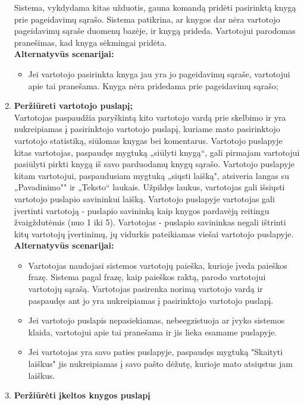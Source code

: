 \documentclass{VUMIFPSkursinis}
\begin{document}
\begin{enumerate}[label=\textbf{U\arabic*.}]
				Sistema, vykdydama kitas užduotis, gauna komandą pridėti pasirinktą knygą prie pageidavimų sąrašo.
				Sistema patikrina, ar knygos dar nėra vartotojo pageidavimų sąraše duomenų bazėje, ir knygą prideda.
				Vartotojui parodomas pranešimas, kad knyga sėkmingai pridėta.\\
				\textbf{Alternatyvūs scenarijai:}
				\begin{itemize}
					\item Jei vartotojo pasirinkta knyga jau yra jo pageidavimų sąraše, vartotojui apie tai pranešama. Knyga nėra pridedama prie pageidavimų sąrašo;
				\end{itemize}
			\item \textbf{Peržiūreti vartotojo puslapį;}\\
				Vartotojas paspaudžia paryškintą kito vartotojo vardą prie skelbimo ir yra nukreipiamas į pasirinktojo vartotojo puslapį, kuriame mato pasirinktojo vartotojo statistiką, siūlomas knygas bei komentarus. 
				Vartotojo puslapyje kitas vartotojas, paspaudęs mygtuką „siūlyti knygą“, gali pirmajam vartotojui pasiūlyti pirkti knygą iš savo parduodamų knygų sąrašo.
				Vartotojo puslapyje kitam vartotojui, paspaudusiam mygtuką „siųsti laišką", atsiveria langas su „Pavadinimo"" ir „Teksto“ laukais. Užpildęs laukus, vartotojas gali išsiųsti vartotojo puslapio savininkui laišką. 
				Vartotojo puslapyje vartotojas gali įvertinti vartotoją - puslapio savininką kaip knygos pardavėją reitingu žvaigždutėmis (nuo 1 iki 5).
				Vartotojas - puslapio savininkas negali ištrinti kitų vartotojų įvertinimų, jų vidurkis pateikiamas viešai vartotojo puslapyje.\\
				\textbf{Alternatyvūs scenarijai:}
				\begin{itemize}
					\item Vartotojas naudojasi sistemos vartotojų paieška, kurioje įveda paieškos frazę. Sistema pagal frazę, kaip paieškos raktą, parodo vartotojui vartotojų sąrašą.  Vartotojas pasirenka norimą vartotojo vardą ir paspaudęs ant jo yra nukreipiamas į pasirinktojo vartotojo puslapį.
					\item Jei vartotojo puslapis nepasiekiamas, nebeegzistuoja ar įvyko sistemos klaida, vartotojui apie tai pranešama ir jis lieka esamame puslapyje.
					\item Jei vartotojas yra savo paties puslapyje, paspaudęs mygtuką "Skaityti laiškus" jis nukreipiamas į savo pašto dėžutę, kurioje mato atsiųstus jam laiškus.
				\end{itemize}
			\item \textbf{Peržiūrėti įkeltos knygos puslapį}\\

\end{enumerate}
\end{document}
